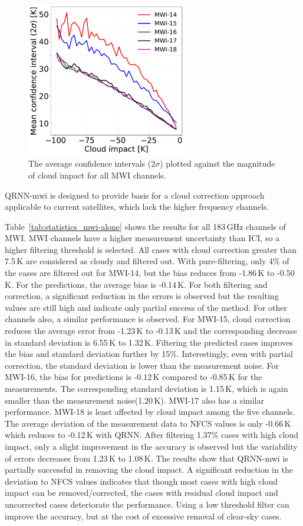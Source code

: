 \documentclass[amt, manuscript]{copernicus}
\begin{document}
\begin{figure}[t]
	\includegraphics[width = 70mm]{Figures/cloud_impact_uncertainty_MWI.pdf}	
	\caption{The average confidence intervals (2$\sigma$) plotted against the magnitude of cloud impact for all MWI channels.}
	\label{fig:uncertainty_cloud_impact}	
\end{figure}
QRNN-mwi is designed to provide basis for a cloud correction approach applicable to current satellites, which lack the higher frequency channels. 

Table~\ref{tab:statistics_mwi-alone} shows the results for all 183\,GHz channels of MWI. MWI channels have a higher measurement uncertainty than ICI, so a higher filtering threshold is selected. All cases with cloud correction greater than 7.5\,K are considered as cloudy and filtered out. With pure-filtering, only 4\% of the cases are filtered out for MWI-14, but the bias reduces from -1.86\,K to -0.50\,K. For the predictions, the average bias is -0.14\,K. For both filtering and correction, a significant reduction in the errors is observed but the resulting values are still high and indicate only partial success of the method. For other channels also, a similar performance is observed.  For MWI-15, cloud correction reduces the average error from -1.23\,K to -0.13\,K  and the corresponding decrease in standard deviation is 6.55\,K to 1.32\,K. Filtering the predicted cases improves the bias and standard deviation further by 15\%. Interestingly, even with partial correction, the standard deviation is lower than the measurement noise. For MWI-16, the bias for predictions is -0.12\,K compared to -0.85\,K for the measurements. The corresponding standard deviation is  1.15\,K, which is again smaller than the measurement noise(1.20\,K). MWI-17 also has a similar performance. MWI-18 is least affected by cloud impact among the five channels. The average deviation of the measurement data to NFCS values is only -0.66\,K which reduces to -0.12\,K with QRNN. After filtering 1.37\% cases with high cloud impact, only a slight improvement in the accuracy is observed but the variability of errors decreases from 1.23\,K to 1.08\,K. The results show that QRNN-mwi is partially successful in removing the cloud impact. A significant reduction in the deviation to NFCS values indicates that though most cases with high cloud impact can be removed/corrected, the cases with residual cloud impact and uncorrected cases deteriorate the performance. Using a low threshold filter can improve the accuracy, but at the cost of excessive removal of clear-sky cases. 
\end{document}
